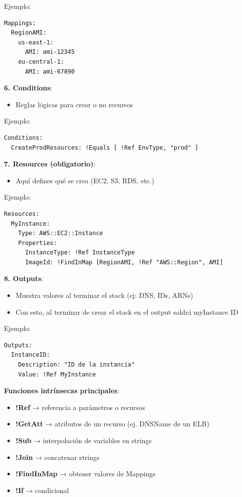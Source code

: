 \documentclass[12pt,a4paper]{report}
\begin{document}
Ejemplo:
\begin{verbatim}
Mappings:
  RegionAMI:
    us-east-1:
      AMI: ami-12345
    eu-central-1:
      AMI: ami-67890
\end{verbatim}

\textbf{6. Conditions}:
\begin{itemize}
    \item Reglas lógicas para crear o no recursos
\end{itemize}

Ejemplo:
\begin{verbatim}
Conditions:
  CreateProdResources: !Equals [ !Ref EnvType, "prod" ]
\end{verbatim}

\textbf{7. Resources (obligatorio)}:
\begin{itemize}
    \item Aquí defines qué se crea (EC2, S3, RDS, etc.)
\end{itemize}

Ejemplo:
\begin{verbatim}
Resources:
  MyInstance:
    Type: AWS::EC2::Instance
    Properties:
      InstanceType: !Ref InstanceType
      ImageId: !FindInMap [RegionAMI, !Ref "AWS::Region", AMI]
\end{verbatim}

\textbf{8. Outputs}:
\begin{itemize}
    \item Muestra valores al terminar el stack (ej: DNS, IDs, ARNs)
    \item Con esto, al terminar de crear el stack en el output saldrá myInstance ID
\end{itemize}

Ejemplo:
\begin{verbatim}
Outputs:
  InstanceID:
    Description: "ID de la instancia"
    Value: !Ref MyInstance
\end{verbatim}

\textbf{Funciones intrínsecas principales}:
\begin{itemize}
    \item \textbf{!Ref} → referencia a parámetros o recursos
    \item \textbf{!GetAtt} → atributos de un recurso (ej. DNSName de un ELB)
    \item \textbf{!Sub} → interpolación de variables en strings
    \item \textbf{!Join} → concatenar strings
    \item \textbf{!FindInMap} → obtener valores de Mappings
    \item \textbf{!If} → condicional
\end{itemize}
\end{document}
